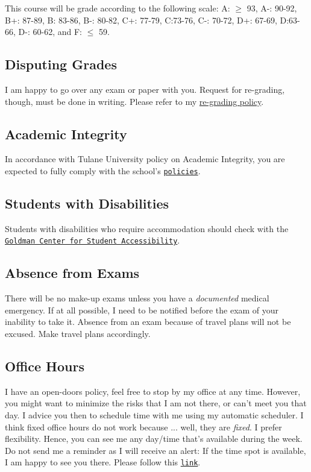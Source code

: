 \documentclass[letterpaper]{article}
\begin{document}
This course will be grade according to the following scale: 
A: $\geq$ 93, A-: 90-92, B+: 87-89, B: 83-86, B-: 80-82, C+: 77-79, C:73-76, C-: 70-72, D+: 67-69, D:63-66, D-: 60-62, and F: $\leq$ 59. 

\subsection*{Disputing Grades}

I am happy to go over any exam or paper with you. Request for re-grading, though, must be done in writing. Please refer to my \href{https://github.com/hbahamonde/hbahamonde.github.io/raw/master/resources/ReGrade_Policy.pdf}{re-grading policy}.



\subsection*{Academic Integrity}
In accordance with Tulane University policy on Academic Integrity, you are expected to fully comply with the school's \href{https://college.tulane.edu/code-of-academic-conduct}{\texttt{policies}}. 


\subsection*{Students with Disabilities}
Students with disabilities who require accommodation should check with the \href{https://accessibility.tulane.edu/}{\texttt{Goldman Center for Student Accessibility}}.


\subsection*{Absence from Exams}


There will be no make-up exams unless you have a \emph{documented} medical emergency. If at all possible, I need to be notified before the exam of your inability to take it. Absence from an exam because of travel plans will not be excused. Make travel plans accordingly. 


\subsection*{Office Hours}

I have an open-doors policy, feel free to stop by my office at any time. However, you might want to minimize the risks that I am not there, or can't meet you that day. I advice you then to schedule time with me using my automatic scheduler. I think fixed office hours do not work because ... well, they are \emph{fixed}. I prefer flexibility. Hence, you can see me any day/time that's available during the week. Do not send me a reminder as I will receive an alert: If the time spot is available, I am happy to see you there. Please follow this \href{https://calendly.com/bahamonde/officehours}{\texttt{link}}.
\end{document}
